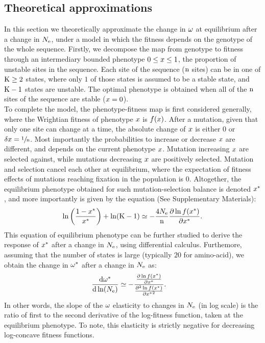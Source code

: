\documentclass{article}
\begin{document}
\subsection*{Theoretical approximations}
In this section we theoretically approximate the change in $\omega$ at equilibrium after a change in $N_{\mathrm{e}}$, under a model in which the fitness depends on the genotype of the whole sequence.
Firstly, we decompose the map from genotype to fitness through an intermediary bounded phenotype $0 \leq x \leq 1$, the proportion of unstable sites in the sequence.
Each site of the sequence ($\text{n}$ sites) can be in one of $\text{K} \geq 2$ states, where only $1$ of those states is assumed to be a stable state, and $\text{K} - 1$ states are unstable.
The optimal phenotype is obtained when all of the $\text{n}$ sites of the sequence are stable ($x = 0$).\\
To complete the model, the phenotype-fitness map is first considered generally, where the Wrightian fitness of phenotype $x$ is $f(x)$.
After a mutation, given that only one site can change at a time, the absolute change of $x$ is either $0$ or $\delta x=\sfrac{1}{\text{n}}$.
Most importantly the probabilities to increase or decrease $x$ are different, and depends on the current phenotype $x$.
Mutation increasing $x$ are selected against, while mutations decreasing $x$ are positively selected. 
Mutation and selection cancel each other at equilibrium, where the expectation of fitness effects of mutations reaching fixation in the population is $0$.
Altogether, the equilibrium phenotype obtained for such mutation-selection balance is denoted $x^{*}$, and more importantly is given by the equation (See Supplementary Materials):
\begin{align}
\ln \left( \frac{1 - x^{*}}{x^{*}} \right) + \ln (\text{K}-1) \simeq - \frac{4N_{\mathrm{e}}}{\text{n}} \frac{ \partial \ln f(x^{*}) }{\partial {x^{*}}}.
\end{align}
This equation of equilibrium phenotype can be further studied to derive the response of $x^{*}$ after a change in $N_{\mathrm{e}}$, using differential calculus.
Furthemore, assuming that the number of states is large (typically $20$ for amino-acid), we obtain the change in $\omega^{*}$ after a change in $N_{\mathrm{e}}$ as: 
\begin{align}
\frac{ \mathrm{d} \omega^{*}}{\mathrm{d} \ln (N_{\mathrm{e}})} & \simeq - \frac{\frac{ \partial \ln f(x^{*}) }{\partial {x^{*}}}}{\frac{ \partial^2 \ln f(x^{*}) }{\partial {x^{*}}^2}}.
\end{align}
In other words, the slope of the $\omega$ elasticity to changes in $N_{\mathrm{e}}$ (in log scale) is the ratio of first to the second derivative of the log-fitness function, taken at the equilibrium phenotype. To note, this elasticity is strictly negative for decreasing log-concave fitness functions.\\
\end{document}
